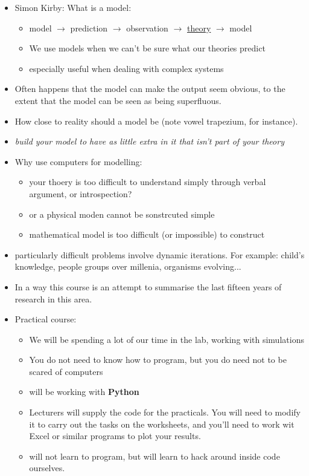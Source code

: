 \documentclass[11pt]{amsart}
\begin{document}
\begin{itemize}
\item Simon Kirby: What is a model: \begin{itemize}
\item model $\rightarrow$ prediction $\rightarrow$ observation $\rightarrow$ \underline{theory} $\rightarrow$ model
\item We use models when we can't be sure what our theories predict
\item especially useful when dealing with complex systems \end{itemize}
\item Often happens that the model can make the output seem obvious, to the extent that the model can be seen as being superfluous. 
\item How close to reality should a model be (note vowel trapezium, for instance). 
\item {\it build your model to have as little extra in it that isn't part of your theory}
\item Why use computers for modelling: \begin{itemize}
\item your thoery is too difficult to understand simply through verbal argument, or introspection?
\item or a physical moden cannot be sonstrcuted simple
\item mathematical model is too difficult (or impossible) to construct \end{itemize}
\item particularly difficult problems involve dynamic iterations. For example: child's knowledge, people groups over millenia, organisms evolving...
\item In a way this course is an attempt to summarise the last fifteen years of research in this area.
\item Practical course: \begin{itemize}
\item We will be spending a lot of our time in the lab, working with simulations
\item You do not need to know how to program, but you do need not to be scared of computers
\item will be working with {\bf Python}
\item Lecturers will supply the code for the practicals. You will need to modify it to carry out the tasks on the worksheets, and you'll need to work wit Excel or similar programs to plot your results.
\item will not learn to program, but will learn to hack around inside code ourselves. \end{itemize}

\end{itemize}
\end{document}
